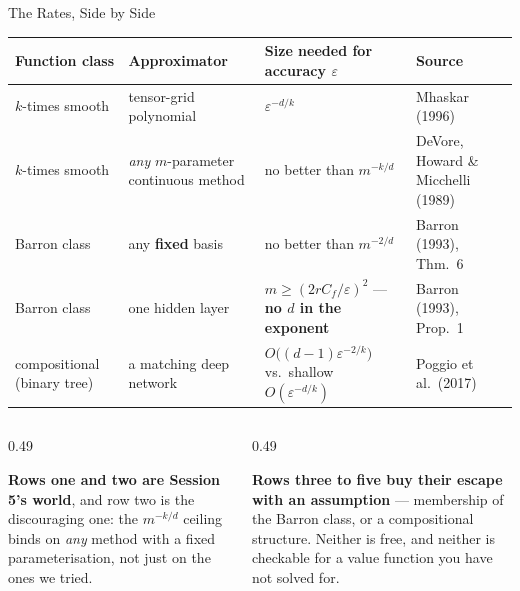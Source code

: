 \begin{frame}{The Rates, Side by Side}
\vspace{-1mm}
\begin{center}\footnotesize
\begin{tabularx}{\linewidth}{@{}>{\raggedright\arraybackslash}p{2.3cm} >{\raggedright\arraybackslash}p{3.0cm} >{\raggedright\arraybackslash}X >{\raggedright\arraybackslash}p{2.6cm}@{}}
\toprule
\textbf{Function class} & \textbf{Approximator} & \textbf{Size needed for accuracy $\varepsilon$} & \textbf{Source} \\
\midrule
$k$-times smooth & tensor-grid polynomial & $\varepsilon^{-d/k}$ & Mhaskar (1996) \\
$k$-times smooth & \emph{any} $m$-parameter continuous method & no better than $m^{-k/d}$ & DeVore, Howard \& Micchelli (1989) \\
Barron class & any \textbf{fixed} basis & no better than $m^{-2/d}$ & Barron (1993), Thm.~6 \\
Barron class & one hidden layer & $m\ge(2rC_f/\varepsilon)^{2}$ --- \textbf{no $d$ in the exponent} & Barron (1993), Prop.~1 \\
compositional (binary tree) & a matching deep network & $O\bigl((d-1)\varepsilon^{-2/k}\bigr)$ vs.\ shallow $O(\varepsilon^{-d/k})$ & Poggio et al.\ (2017) \\
\bottomrule
\end{tabularx}
\end{center}
\medskip
\begin{columns}[T]
\begin{column}{0.49\textwidth}
\begin{takeawaybox}\footnotesize
\textbf{Rows one and two are Session 5's world}, and row two is the discouraging one: the $m^{-k/d}$ ceiling binds on \emph{any} method with a fixed parameterisation, not just on the ones we tried.
\end{takeawaybox}
\end{column}
\begin{column}{0.49\textwidth}
\begin{cautionbox}\footnotesize
\textbf{Rows three to five buy their escape with an assumption} --- membership of the Barron class, or a compositional structure. Neither is free, and neither is checkable for a value function you have not solved for.
\end{cautionbox}
\end{column}
\end{columns}
\vspace{1mm}
\end{frame}


